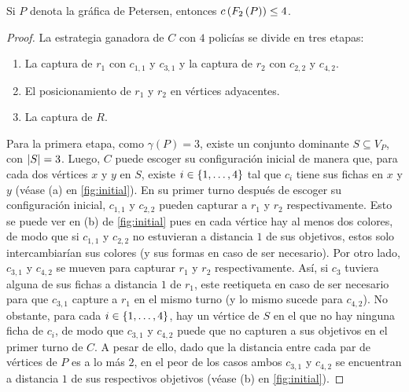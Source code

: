     
\begin{teorema}
    Si $P$ denota la gr\'afica de Petersen, entonces $c\left( F_{2}\left( P\right)\right)\leq4$.
\end{teorema}

\begin{proof}
    La estrategia ganadora de $C$ con $4$ polic\'ias se divide en tres etapas:
    \begin{enumerate}
        \item La captura de $r_1$ con $c_{1,1}$ y $c_{3,1}$ y la captura de
        $r_2$ con $c_{2,2}$ y $c_{4,2}$.

        \item El posicionamiento de $r_1$ y $r_2$ en v\'ertices adyacentes.
    
        \item La captura de $R$.
    \end{enumerate}

    Para la primera etapa, como $\gamma(P)=3$, existe un conjunto dominante
    $S\subseteq V_P$, con $ \left|S\right|=3$. Luego, $C$ puede escoger su
    configuraci\'on inicial de manera que, para cada dos v\'ertices $x$ y $y$ en
    $S$, existe $i\in\{1,\dots, 4\}$ tal que $c_i$ tiene sus fichas en $x$ y $y$
    (v\'ease (a) en \cref{fig:initial}). En su primer turno despu\'es de escoger
    su configuraci\'on inicial, $c_{1,1}$ y $c_{2,2}$ pueden capturar a $r_1$ y
    $r_2$ respectivamente. Esto se puede ver en (b) de \cref{fig:initial} pues
    en cada v\'ertice hay al menos dos colores, de modo que si $c_{1,1}$ y
    $c_{2,2}$ no estuvieran a distancia $1$ de sus objetivos, estos solo
    intercambiar\'ian sus colores (y sus formas en caso de ser necesario). Por
    otro lado, $c_{3,1}$ y $c_{4,2}$ se mueven para capturar $r_1$ y $r_2$
    respectivamente. As\'i, si $c_3$ tuviera alguna de sus fichas a distancia
    $1$ de $r_1$, este reetiqueta en caso de ser necesario para que $c_{3,1}$
    capture a $r_1$ en el mismo turno (y lo mismo sucede para $c_{4,2}$). No
    obstante, para cada $i\in\{1,\dots, 4\}$, hay un v\'ertice de $S$ en el que no
    hay ninguna ficha de $c_i$, de modo que $c_{3,1}$ y $c_{4,2}$ puede que no
    capturen a sus objetivos en el primer turno de $C$. A pesar de ello, dado
    que la distancia entre cada par de v\'ertices de $P$ es a lo m\'as $2$, en
    el peor de los casos ambos $c_{3,1}$ y $c_{4,2}$ se encuentran a distancia
    $1$ de sus respectivos objetivos (v\'ease (b) en \cref{fig:initial}).


\end{proof}
